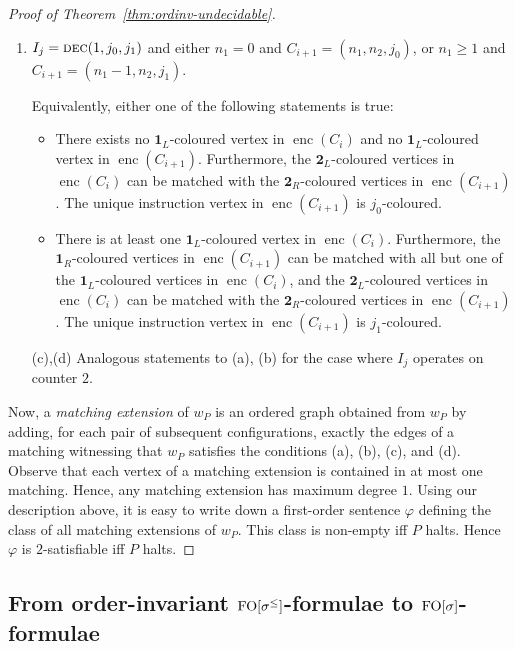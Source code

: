 \documentclass[11pt]{article}
\renewcommand{\phi}{\varphi}
\newcommand{\IONE}{\mathbf{1}}
\newcommand{\ITWO}{\mathbf{2}}
\newcommand{\IONEL}{\IONE_L}
\newcommand{\IONER}{\IONE_R}
\newcommand{\ITWOL}{\ITWO_L}
\newcommand{\ITWOR}{\ITWO_R}
\newcommand{\enc}{\operatorname{enc}} \newcommand{\inc}{\textsc{inc}}
\newcommand{\dec}{\textsc{dec}} \newcommand{\halt}{\textsc{halt}}
\begin{document}
\begin{proof}[Proof of Theorem~\ref{thm:ordinv-undecidable}]
\begin{enumerate}
\begin{enumerate}
    \item $I_j=\dec(1,j_0,j_1)$ and either $n_1=0$ and
      $C_{i+1}=(n_1,n_2,j_0)$, or $n_1\geq 1$ and
      $C_{i+1}=(n_1-1,n_2,j_1)$.

      Equivalently, either one of the following statements is true:
      \begin{itemize}
      \item There exists no $\IONEL$-coloured vertex in
        $\enc(C_{i})$ and no $\IONEL$-col\-oured vertex in
        $\enc(C_{i+1})$. Furthermore, the $\ITWOL$-coloured vertices in
        $\enc(C_i)$ can be matched with the $\ITWOR$-coloured
        vertices in $\enc(C_{i+1})$. The unique instruction
        vertex in $\enc(C_{i+1})$ is $j_0$-coloured.
      \item There is at least one $\IONEL$-coloured vertex in
        $\enc(C_{i})$. Furthermore, the $\IONER$-coloured vertices in
        $\enc(C_{i+1})$ can be matched with all but one of the
        $\IONEL$-coloured vertices in $\enc(C_i)$, and the
        $\ITWOL$-coloured vertices in $\enc(C_{i})$ can be
        matched with the $\ITWOR$-coloured vertices in
        $\enc(C_{i+1})$.
        The unique instruction vertex in $\enc(C_{i+1})$ is $j_1$-coloured.
      \end{itemize}
    \item[(c),(d)] Analogous statements to (a), (b) for the case where
      $I_j$ operates on counter $2$.
    \end{enumerate}
  \end{enumerate}
  Now, a \emph{matching extension} of $w_P$ is an ordered graph
  obtained from $w_P$ by adding, for each pair of subsequent
  configurations, exactly the edges of a matching witnessing that
  $w_{P}$ satisfies the conditions (a), (b), (c), and (d). Observe
  that each vertex of a matching extension is contained in at most one
  matching. Hence, any matching extension has maximum degree $1$.
  Using our description above, it is easy to write down a first-order
  sentence $\phi$ defining the class of all matching extensions of
  $w_P$. This class is non-empty iff $P$ halts. Hence $\phi$ is
  $2$-satisfiable iff $P$ halts.
\end{proof}

\subsection{From order-invariant $\textup{FO}[\sigma^{\leq}]$-formulae to $\textup{FO}[\sigma]$-formulae}
\label{sec:oifo-to-fo}
\end{document}
